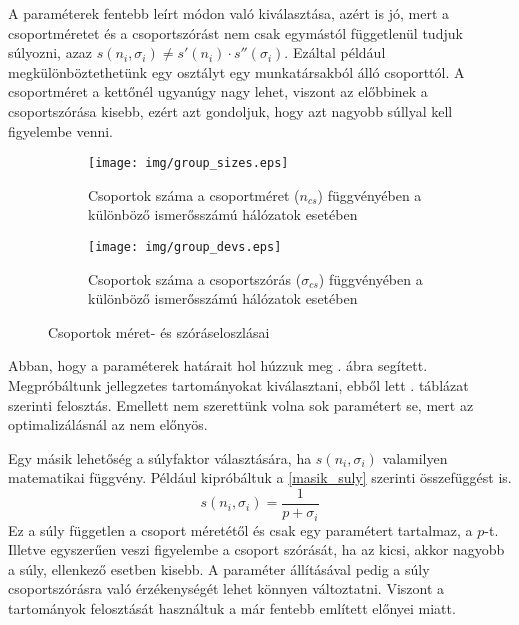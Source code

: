 \documentclass[12pt]{article}
\begin{document}
A paraméterek fentebb leírt módon való kiválasztása, azért is jó, mert a csoportméretet és a csoportszórást nem csak egymástól függetlenül tudjuk súlyozni, azaz $s(n_i, \sigma_i) \neq s'(n_i)\cdot s''(\sigma_i)$. Ezáltal például megkülönböztethetünk egy osztályt egy munkatársakból álló csoporttól. A csoportméret a kettőnél ugyanúgy nagy lehet, viszont az előbbinek a csoportszórása kisebb, ezért azt gondoljuk, hogy azt nagyobb súllyal kell figyelembe venni.
\begin{figure}[H]
	\centering
	\begin{subfigure}{0.49\textwidth}
		\texttt{[image: img/group\_sizes.eps]}
		\caption{Csoportok száma a csoportméret ($n_{cs}$) függvényében a különböző ismerősszámú hálózatok esetében}
	\end{subfigure} \hfill
	\begin{subfigure}{0.49\textwidth}
		\texttt{[image: img/group\_devs.eps]}
		\caption{Csoportok száma a csoportszórás ($\sigma_{cs}$) függvényében a különböző ismerősszámú hálózatok esetében}
	\end{subfigure}
	\caption{Csoportok méret- és szóráseloszlásai}
	\label{meret_szoras_eloszlas}
\end{figure}
Abban, hogy a paraméterek határait hol húzzuk meg . ábra segített. Megpróbáltunk jellegzetes tartományokat kiválasztani, ebből lett . táblázat szerinti felosztás. Emellett nem szerettünk volna sok paramétert se, mert az optimalizálásnál az nem előnyös.

Egy másik lehetőség a súlyfaktor választására, ha $s(n_i, \sigma_i)$ valamilyen matematikai függvény. Például kipróbáltuk a \eqref{masik_suly} szerinti összefüggést is.
\begin{equation} \label{masik_suly}
	s(n_i, \sigma_i) = \frac{1}{p + \sigma_i}
\end{equation}
Ez a súly független a csoport méretétől és csak egy paramétert tartalmaz, a $p$-t. Illetve egyszerűen veszi figyelembe a csoport szórását, ha az kicsi, akkor nagyobb a súly, ellenkező esetben kisebb. A paraméter állításával pedig a súly csoportszórásra való érzékenységét lehet könnyen változtatni. Viszont a tartományok felosztását használtuk a már fentebb említett előnyei miatt.
\end{document}
